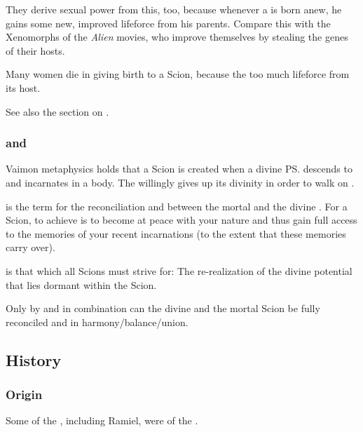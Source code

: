 They derive sexual power from this, too, because whenever a \malach{} is born anew, he gains some new, improved lifeforce from his parents. Compare this with the Xenomorphs of the \emph{Alien} movies, who improve themselves by stealing the genes of their hosts. 

Many women die in giving birth to a Scion, because the \malach{}  too much lifeforce from its host. 

See also the section on . 





\subsubsection{\Kenosis{} and \Apotheosis}
\index{\kenosis}
\index{\apotheosis}
Vaimon metaphysics holds that a Scion is created when a divine \ps{\Malach}{} descends to \Miith{} and incarnates in a \human{} body. 
The \Malach{} willingly gives up its divinity in order to walk on \Miith{}. 

\quo{\Kenosis} is the term for the reconciliation and between the mortal \human{} and the divine \malach. 
For a Scion, to achieve \kenosis{} is to become at peace with your nature and thus gain full access to the memories of your recent incarnations (to the extent that these memories carry over). 

\quo{\Apotheosis} is that which all Scions must strive for: 
The re-realization of the divine potential that lies dormant within the Scion. 

Only by \Kenosis{} and \Apotheosis{} in combination can the divine \Malach{} and the mortal Scion be fully reconciled and in harmony/balance/union. 










\subsection{History}





\subsubsection{Origin}
Some of the \Malachim, including Ramiel, were of the \satharioth. 

